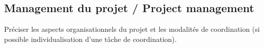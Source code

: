 
\subsection{Management du projet / Project management}
\begin{xcomment}  
Pr\'eciser les aspects organisationnels du projet et les modalit\'es de coordination (si possible individualisation d'une tâche de coordination).
\end{xcomment}

\endinput

